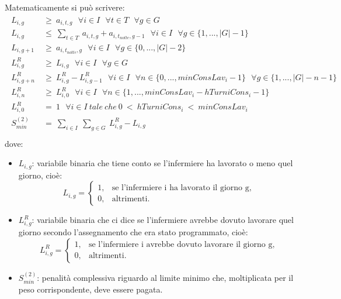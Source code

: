 Matematicamente si può scrivere:
\begin{gather}
\begin{aligned}
L_{i, g} ~ &\geq ~ a_{i, t, g} ~~~ \forall i \in I ~~~ \forall t \in T ~~~ \forall g \in G \\
L_{i, g} ~ &\leq ~ \sum_{t \in T} ~ a_{i, t, g} + a_{i, t_{notte}, g-1} ~~~ \forall i \in I ~~~ \forall g \in \{1,...,|G| - 1\} \\
L_{i, g+1} ~ &\geq ~ a_{i, t_{notte}, g} ~~~ \forall i \in I ~~~ \forall g \in \{0,...,|G| - 2\} \\
L_{i, g}^R ~ &\geq ~ L_{i, g} ~~~ \forall i \in I ~~~ \forall g \in G \\
L_{i, g+n}^R ~ &\geq ~ L_{i, g}^R - L_{i, g-1}^R ~~~ \forall i \in I ~~~ \forall n \in \{0,...,minConsLav_i - 1\} ~~~ \forall g \in \{1,...,|G| - n - 1\} \\
L_{i, n}^R ~ &\geq ~ L_{i, 0}^R ~~~ \forall i \in I ~~~ \forall n \in \{1,...,minConsLav_i - hTurniCons_i - 1\} \\
L_{i, 0}^R ~ &= ~ 1 ~~~ \forall i \in I ~ tale ~ che ~ 0 ~ < ~ hTurniCons_i ~ < ~ minConsLav_i \\
S^{(2)}_{min} ~ &= ~ \sum_{i \in I} ~ \sum_{g \in G} ~ L_{i, g}^R - L_{i, g} \\
\end{aligned}
\end{gather}
dove: 
\begin{itemize}
\item $L_{i, g}$: variabile binaria che tiene conto se l'infermiere ha lavorato o meno quel giorno, cioè:
\begin{equation}
\label{eq:varLavorato}
L_{i, g}=
\begin{cases}
1, & \text{se l'infermiere i ha lavorato il giorno g,} \\
0, & \text{altrimenti.}
\end{cases}
\end{equation}
\item $L_{i, g}^R$: variabile binaria che ci dice se l'infermiere avrebbe dovuto lavorare quel giorno secondo l'assegnamento che era stato programmato, cioè:
\begin{equation}
\label{eq:varAvrebbeDovutoLavorare}
L_{i, g}^R=
\begin{cases}
1, & \text{se l'infermiere i avrebbe dovuto lavorare il giorno g,} \\
0, & \text{altrimenti.}
\end{cases}
\end{equation}
\item $S^{(2)}_{min}$: penalità complessiva riguardo al limite minimo che, moltiplicata per il peso corrispondente, deve essere pagata.
\end{itemize}

